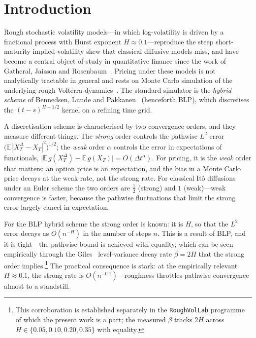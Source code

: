 \documentclass{ws-ijtaf}
\begin{document}


\section{Introduction}\label{sec:intro}

Rough stochastic volatility models---in which log-volatility is driven by a
fractional process with Hurst exponent $H\approx 0.1$---reproduce the steep
short-maturity implied-volatility skew that classical diffusive models miss, and
have become a central object of study in quantitative finance since the work of
Gatheral, Jaisson and Rosenbaum~\citeyearpar{gjr2018}. Pricing under these models is not analytically
tractable in general and rests on Monte Carlo simulation of the underlying rough
Volterra dynamics~\citep{bfg2016}. The standard simulator is the \emph{hybrid scheme} of
Bennedsen, Lunde and Pakkanen~\citeyearpar{blp2017} (henceforth BLP), which discretises the
$(t-s)^{H-1/2}$ kernel on a refining time grid.

A discretisation scheme is characterised by two convergence orders, and they
measure different things. The \emph{strong} order controls the pathwise
$L^2$ error $\big(\mathbb{E}\,|X_T^\Delta - X_T|^2\big)^{1/2}$; the \emph{weak}
order $\alpha$ controls the error in expectations of functionals,
$\big|\mathbb{E}\,g(X_T^\Delta) - \mathbb{E}\,g(X_T)\big| = O(\Delta t^{\alpha})$.
For pricing, it is the \emph{weak} order that matters: an option price is an
expectation, and the bias in a Monte Carlo price decays at the weak rate, not the
strong rate. For classical It\^o diffusions under an Euler scheme the two orders are
$\tfrac12$ (strong) and $1$ (weak)---weak convergence is faster, because the
pathwise fluctuations that limit the strong error largely cancel in expectation.

For the BLP hybrid scheme the strong order is known: it is $H$, so that the
$L^2$ error decays as $O(n^{-H})$ in the number of steps $n$. This is a result of
BLP, and it is tight---the pathwise bound is achieved with equality, which can be
seen empirically through the Giles~\citeyearpar{giles2008} level-variance decay rate $\beta = 2H$ that the
strong order implies.\footnote{This corroboration is established separately in the
\texttt{RoughVolLab} programme of which the present work is a part; the measured
$\beta$ tracks $2H$ across $H\in\{0.05,0.10,0.20,0.35\}$ with equality.} The
practical consequence is stark: at the empirically relevant $H\approx 0.1$, the
strong rate is $O(n^{-0.1})$---roughness throttles pathwise convergence almost to a
standstill.
\end{document}
